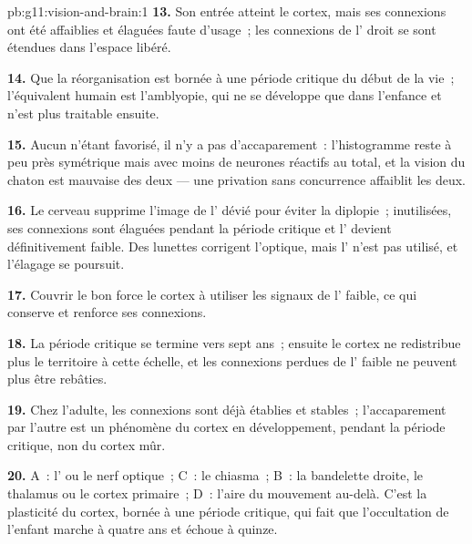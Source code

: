 \begin{solution}{pb:g11:vision-and-brain:1}
\textbf{13.} Son entrée atteint le cortex, mais ses connexions ont été
affaiblies et élaguées faute d'usage~; les connexions de l' droit se
sont étendues dans l'espace libéré.

\textbf{14.} Que la réorganisation est bornée à une période critique du
début de la vie~; l'équivalent humain est l'amblyopie, qui ne se
développe que dans l'enfance et n'est plus traitable ensuite.

\textbf{15.} Aucun  n'étant favorisé, il n'y a pas d'accaparement~:
l'histogramme reste à peu près symétrique mais avec moins de neurones
réactifs au total, et la vision du chaton est mauvaise des deux 
--- une privation sans concurrence affaiblit les deux.

\textbf{16.} Le cerveau supprime l'image de l' dévié pour éviter la
diplopie~; inutilisées, ses connexions sont élaguées pendant la période
critique et l' devient définitivement faible. Des lunettes corrigent
l'optique, mais l' n'est pas utilisé, et l'élagage se poursuit.

\textbf{17.} Couvrir le bon  force le cortex à utiliser les signaux
de l' faible, ce qui conserve et renforce ses connexions.

\textbf{18.} La période critique se termine vers sept ans~; ensuite le
cortex ne redistribue plus le territoire à cette échelle, et les
connexions perdues de l' faible ne peuvent plus être rebâties.

\textbf{19.} Chez l'adulte, les connexions sont déjà établies et
stables~; l'accaparement par l'autre  est un phénomène du cortex en
développement, pendant la période critique, non du cortex mûr.

\textbf{20.} A~: l' ou le nerf optique~; C~: le chiasma~; B~: la
bandelette droite, le thalamus ou le cortex primaire~; D~: l'aire du
mouvement au-delà. C'est la plasticité du cortex, bornée à une période
critique, qui fait que l'occultation de l'enfant marche à quatre ans et
échoue à quinze.
\end{solution}
